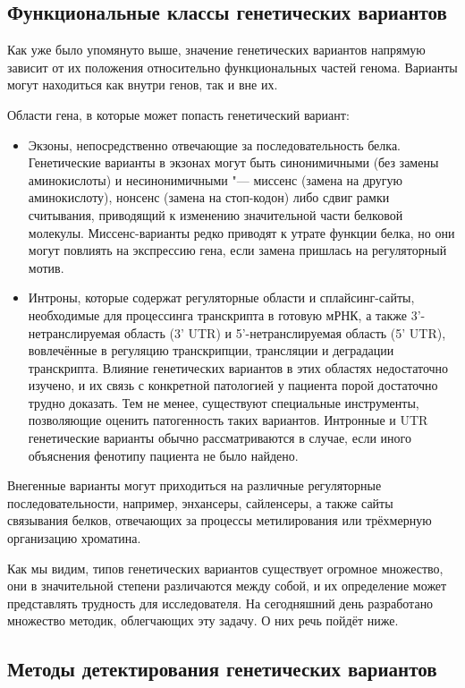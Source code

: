 \documentclass[a4paper,12pt]{article}
\begin{document}
\subsection{Функциональные классы генетических вариантов}

Как уже было упомянуто выше, значение генетических вариантов напрямую зависит от их положения относительно функциональных частей генома.
Варианты могут находиться как внутри генов, так и вне их.

Области гена, в которые может попасть генетический вариант:

\begin{itemize}
\item Экзоны, непосредственно отвечающие за последовательность белка.
Генетические варианты в экзонах могут быть синонимичными (без замены аминокислоты) и несинонимичными "--- миссенс (замена на другую аминокислоту), нонсенс (замена на стоп-кодон) либо сдвиг рамки считывания, приводящий к изменению значительной части белковой молекулы.
Миссенс-варианты редко приводят к утрате функции белка, но они могут повлиять на экспрессию гена, если замена пришлась на регуляторный мотив\cite{brea-fernandez}.
\item Интроны, которые содержат регуляторные области и сплайсинг-сайты, необходимые для процессинга транскрипта в готовую мРНК, а также 3'-нетранслируемая область (3' UTR) и 5'-нетранслируемая область (5' UTR), вовлечённые в регуляцию транскрипции, трансляции и деградации транскрипта.
Влияние генетических вариантов в этих областях недостаточно изучено, и их связь с конкретной патологией у пациента порой достаточно трудно доказать.
Тем не менее, существуют специальные инструменты, позволяющие оценить патогенность таких вариантов.
Интронные и UTR генетические варианты обычно рассматриваются в случае, если иного объяснения фенотипу пациента не было найдено.
\end{itemize}

Внегенные варианты могут приходиться на различные регуляторные последовательности, например, энхансеры, сайленсеры, а также сайты связывания белков, отвечающих за процессы метилирования или трёхмерную организацию хроматина.

Как мы видим, типов генетических вариантов существует огромное множество, они в значительной степени различаются между собой, и их определение может представлять трудность для исследователя.
На сегодняшний день разработано множество методик, облегчающих эту задачу.
О них речь пойдёт ниже.

\subsection{Методы детектирования генетических вариантов}
\end{document}
